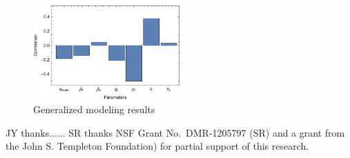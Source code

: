 \documentclass[11pt]{article}
\begin{document}
\begin{figure}[h!]
	\centering
	\includegraphics[width=0.5\textwidth]{fig_GenCorr.pdf}
	\caption{
	Generalized modeling results
	}
	\label{fig_Gen}
\end{figure}

JY thanks......  SR thanks NSF Grant No.\ DMR-1205797 (SR) and a grant from
the John S. Templeton Foundation) for partial support of this research.

\newpage
\end{document}
